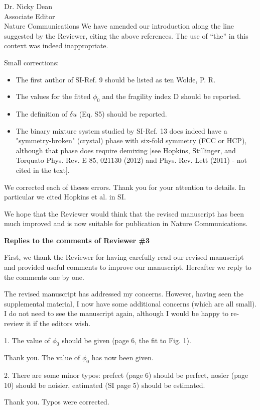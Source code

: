 \documentclass[a4paper, rebuttal, parskip=true, firsthead=false, fromemail=true, foldmarks=false]{scrlttr2}
\begin{document}
\begin{letter}{Dr. Nicky Dean\\
Associate Editor\\
Nature Communications}
We have amended our introduction along the line suggested by the Reviewer, citing the above references. The use of ``the'' in this context was indeed inappropriate.

\begin{quotationi}
Small corrections:
\begin{itemize}
\item The first author of SI-Ref. 9 should be listed as ten Wolde, P. R.
\item The values for the fitted $\phi_0$ and the fragility index D should be reported.
\item The definition of $\delta u$ (Eq. S5) should be reported.
\item The binary mixture system studied by SI-Ref. 13 does indeed have a "symmetry-broken" (crystal) phase with six-fold symmetry (FCC or HCP), although that phase does require demixing [see Hopkins, Stillinger, and Torquato Phys. Rev. E 85, 021130 (2012) and Phys. Rev. Lett (2011) - not cited in the text].
\end{itemize}
\end{quotationi}

We corrected each of theses errors. Thank you for your attention to details. In particular we cited Hopkins et al. in SI.

We hope that the Reviewer would think that the revised manuscript has been much improved and is now suitable for publication in Nature Communications. 
 
\clearpage

\textsf{\textbf{Replies to the comments of Reviewer \#3}}

First, we thank the Reviewer for having carefully read our revised manuscript and provided useful comments to improve our manuscript. Hereafter we reply to the comments one by one. 

\begin{quotationi}
The revised manuscript has addressed my concerns. However, having seen the supplemental material, I now have some additional concerns (which are all small). I do not need to see the manuscript again, although I would be happy to re-review it if the editors wish. 

1. The value of $\phi_0$ should be given (page 6, the fit to Fig. 1). 
\end{quotationi}
Thank you. The value of $\phi_0$ has now been given. 

\begin{quotationi}
2. There are some minor typos: prefect (page 6) should be perfect, nosier (page 10) should be noisier, eatimated (SI page 5) should be estimated.
\end{quotationi}
Thank you. Typos were corrected.


\end{letter}
\end{document}
